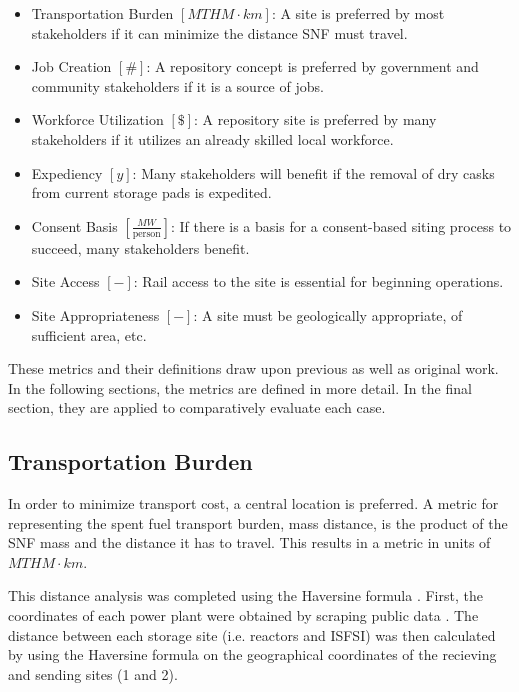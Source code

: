 \begin{itemize}
        \item Transportation Burden $[MTHM \cdot km]$: A site is preferred by 
                most stakeholders if it can minimize the distance \gls{SNF} 
                must travel.
        \item Job Creation $[\#]$: A repository concept is preferred by 
                government and community stakeholders if it is a source of 
                jobs. 
        \item Workforce Utilization $[\$]$: A repository site is preferred by 
                many stakeholders if it utilizes an already skilled local 
                workforce. 
        \item Expediency $[y]$: Many stakeholders will benefit if the removal 
                of dry casks from current storage pads is expedited.
        \item Consent Basis $[\frac{MW}{\mbox{person}}]$: If there is a basis for a consent-based 
                siting process to succeed, many stakeholders benefit.
        \item Site Access $[-]$: Rail access to the site is essential for 
                beginning operations.
        \item Site Appropriateness $[-]$: A site must be geologically 
                appropriate, of sufficient area, etc.
\end{itemize}

These metrics and their definitions draw upon previous 
\cite{freeze_siting_2015,ISRG_book_2016} as well as original work.  In the 
following sections, the metrics are defined in more detail. In 
the final section, they are applied to comparatively evaluate each 
case.

\subsection{Transportation Burden}
 In order to minimize transport cost, a central location is preferred. A metric 
 for representing the spent fuel transport burden, mass distance, is the product 
 of the \gls{SNF} mass and the distance it has to travel. This results in a 
 metric in units of $MTHM\cdot km$. 
 
 This distance analysis was completed using the Haversine formula 
 \cite{shumaker_astronomical_1984}. First, the 
 coordinates of each power plant were obtained by scraping public data 
 \cite{wikipedia}.  The distance between each storage site (i.e. reactors and 
 \gls{ISFSI}) was then calculated by using the Haversine formula on the 
 geographical coordinates of the recieving and sending sites (1 and 2). 

